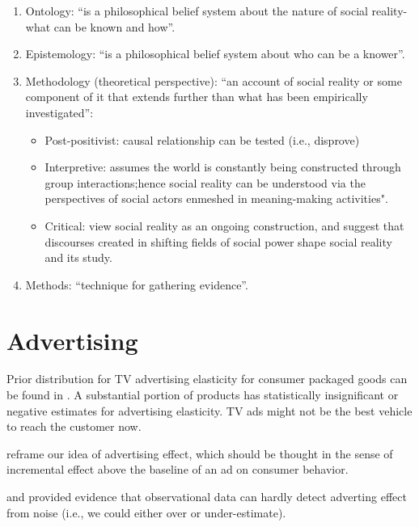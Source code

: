\documentclass[
]{book}
\providecommand{\tightlist}{%
  \setlength{\itemsep}{0pt}\setlength{\parskip}{0pt}}
\begin{document}
\begin{enumerate}
\def\labelenumi{\arabic{enumi}.}
\item
  Ontology: ``is a philosophical belief system about the nature of social reality- what can be known and how''.\\
\item
  Epistemology: ``is a philosophical belief system about who can be a knower''.\\
\item
  Methodology (theoretical perspective): ``an account of social reality or some component of it that extends further
  than what has been empirically investigated'':

  \begin{itemize}
  \tightlist
  \item
    Post-positivist: causal relationship can be tested (i.e., disprove)\\
  \item
    Interpretive: assumes the world is constantly being constructed through group interactions;hence social reality
    can be understood via the perspectives of social actors enmeshed in meaning-making activities".\\
  \item
    Critical: view social reality as an ongoing construction, and suggest that discourses created in shifting fields
    of social power shape social reality and its study.\\
  \end{itemize}
\item
  Methods: ``technique for gathering evidence''.
\end{enumerate}

\hypertarget{advertising}{%
\chapter{Advertising}\label{advertising}}

Prior distribution for TV advertising elasticity for consumer packaged goods can
be found in \citep{Shapiro_2018}. A substantial portion of products has statistically
insignificant or negative estimates for advertising elasticity. TV ads might not
be the best vehicle to reach the customer now.

\citep{Gordon_2019} reframe our idea of advertising effect, which should be thought
in the sense of incremental effect above the baseline of an ad on consumer
behavior.

\citep{Gordon_2017} and \citep{Lewis_2015} provided evidence that observational data can
hardly detect adverting effect from noise (i.e., we could either over or
under-estimate).
\end{document}
